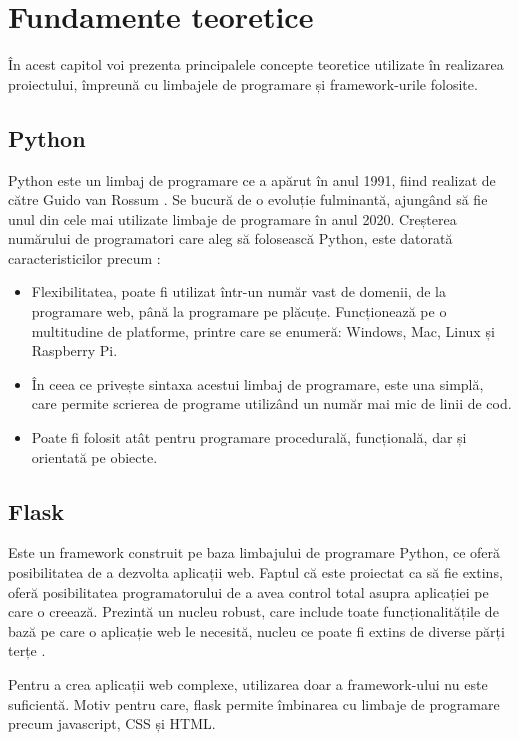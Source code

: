\chapter{Fundamente teoretice}\label{ch:3fundamenteTeoretice}

	În acest capitol voi prezenta principalele concepte teoretice utilizate în realizarea proiectului, împreună cu limbajele de programare și framework-urile folosite. 

\section{Python}
	Python este un limbaj de programare ce a apărut în anul 1991, fiind realizat de către Guido van Rossum \cite{python}. Se bucură de o evoluție fulminantă, ajungând să fie unul din cele mai utilizate limbaje de programare în anul 2020. Creșterea numărului de programatori care aleg să folosească Python, este datorată  caracteristicilor precum \cite{python}: 
	\begin{itemize}
	\setlength{\itemindent}{2em}
	\itemsep0em
	\item Flexibilitatea, poate fi utilizat într-un număr vast de domenii, de la programare web, până la programare pe plăcuțe. Funcționează pe o multitudine de platforme, printre care se enumeră: Windows, Mac, Linux și Raspberry Pi. 
	\item În ceea ce privește sintaxa acestui limbaj de programare, este una simplă, care permite scrierea de programe utilizând un număr mai mic de linii de cod. 
	\item Poate fi folosit atât pentru programare procedurală, funcțională, dar și orientată pe obiecte.
	\end{itemize}

\section{Flask}

	Este un framework construit pe baza limbajului de programare Python, ce oferă posibilitatea de a dezvolta aplicații web. Faptul că este proiectat ca să fie extins, oferă posibilitatea programatorului de a avea control total asupra aplicației pe care o creează. Prezintă un nucleu robust, care include toate funcționalitățile de bază pe care o aplicație web le necesită, nucleu ce poate fi extins de diverse părți terțe \cite{flask}.

	Pentru a crea aplicații web complexe, utilizarea doar a framework-ului nu este suficientă. Motiv pentru care, flask permite îmbinarea cu limbaje de programare precum javascript, CSS și HTML.

